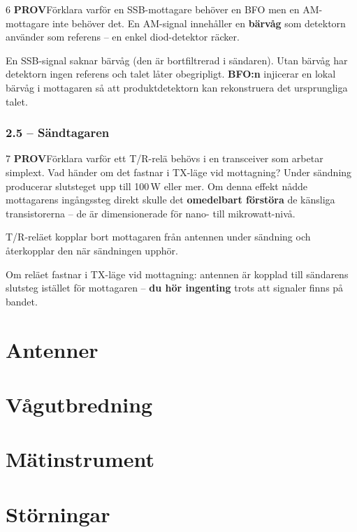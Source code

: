 \documentclass[a4paper,11pt,twoside]{book}
\newcommand{\qprov}{\colorbox{redpale}{\textcolor{reddark}{\headingfont\bfseries\tiny PROV}}}
\begin{document}
\begin{facitblock}{6}
\qprov\quad Förklara varför en SSB-mottagare behöver en BFO
men en AM-mottagare inte behöver det.
\tcblower
En AM-signal innehåller en \textbf{bärvåg} som detektorn använder
som referens -- en enkel diod-detektor räcker.

En SSB-signal saknar bärvåg (den är bortfiltrerad i sändaren).
Utan bärvåg har detektorn ingen referens och talet låter
obegripligt. \textbf{BFO:n} injicerar en lokal bärvåg i
mottagaren så att produktdetektorn kan rekonstruera det
ursprungliga talet.
\end{facitblock}

\subsection*{2.5 – Sändtagaren}

\begin{facitblock}{7}
\qprov\quad Förklara varför ett T/R-relä behövs i en transceiver
som arbetar simplext. Vad händer om det fastnar i TX-läge
vid mottagning?
\tcblower
Under sändning producerar slutsteget upp till 100\,W eller mer.
Om denna effekt nådde mottagarens ingångssteg direkt skulle det
\textbf{omedelbart förstöra} de känsliga {transistorerna} -- de är
dimensionerade för nano- till mikrowatt-nivå.

T/R-reläet kopplar bort mottagaren från antennen under sändning
och återkopplar den när sändningen upphör.

Om reläet fastnar i TX-läge vid mottagning: antennen är kopplad
till sändarens slutsteg istället för mottagaren --
\textbf{du hör ingenting} trots att signaler finns på bandet.
\end{facitblock}


\chapter{Antenner}

\chapter{Vågutbredning}

\chapter{Mätinstrument}

\chapter{Störningar}
\end{document}
